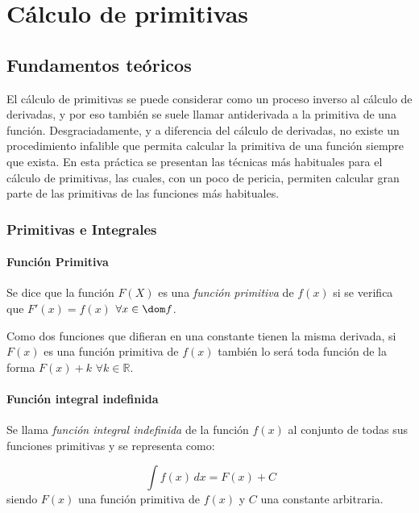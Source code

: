 
\chapter{Cálculo de primitivas}

\section{Fundamentos teóricos}
El cálculo de primitivas se puede considerar como un proceso inverso
al cálculo de derivadas, y por eso también se suele llamar
antiderivada a la primitiva de una función. Desgraciadamente, y a
diferencia del cálculo de derivadas, no existe un procedimiento
infalible que permita calcular la primitiva de una función siempre
que exista. En esta práctica se presentan las técnicas más
habituales para el cálculo de primitivas, las cuales, con un poco de
pericia, permiten calcular gran parte de las primitivas de las
funciones más habituales.

\subsection*{Primitivas e Integrales}
\subsubsection*{Función Primitiva}

Se dice que la función $F(X)$ es una \emph{función primitiva} de
$f(x)$ si se verifica que $F'(x)=f(x)$ $\forall x \in \dom f$.

Como dos funciones que difieran en una constante tienen la misma
derivada, si $F(x)$ es una función primitiva de $f(x)$ también lo será toda función de la forma $F(x)+k$ $\forall k \in \mathbb{R}$.\\


\subsubsection*{Función integral indefinida}

Se llama \emph{función integral indefinida} de la función $f(x)$ al
conjunto de todas sus funciones primitivas y se representa como:

\[
\ \int{f(x)}\,dx=F(x)+C
\]
siendo $F(x)$ una función primitiva de $f(x)$ y $C$ una constante arbitraria.\\


